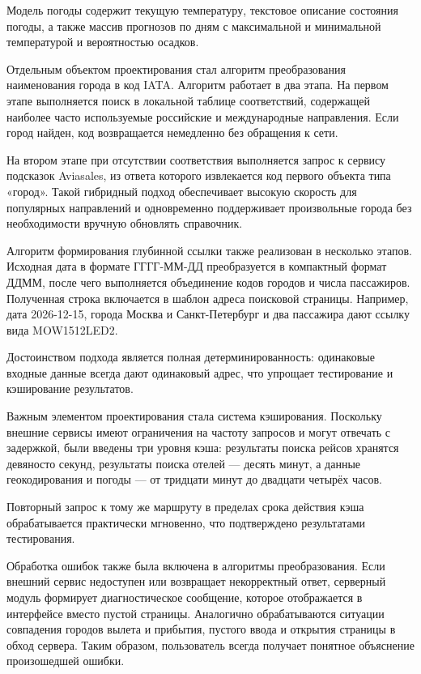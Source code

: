 \documentclass[14pt,a4paper,oneside]{extreport}
\begin{document}
Модель погоды содержит текущую температуру, текстовое описание состояния погоды, а также массив прогнозов по дням с максимальной и минимальной температурой и вероятностью осадков.

Отдельным объектом проектирования стал алгоритм преобразования наименования города в код IATA. Алгоритм работает в два этапа. На первом этапе выполняется поиск в локальной таблице соответствий, содержащей наиболее часто используемые российские и международные направления. Если город найден, код возвращается немедленно без обращения к сети.

На втором этапе при отсутствии соответствия выполняется запрос к сервису подсказок Aviasales, из ответа которого извлекается код первого объекта типа «город». Такой гибридный подход обеспечивает высокую скорость для популярных направлений и одновременно поддерживает произвольные города без необходимости вручную обновлять справочник.

Алгоритм формирования глубинной ссылки также реализован в несколько этапов. Исходная дата в формате ГГГГ-ММ-ДД преобразуется в компактный формат ДДММ, после чего выполняется объединение кодов городов и числа пассажиров. Полученная строка включается в шаблон адреса поисковой страницы. Например, дата 2026-12-15, города Москва и Санкт-Петербург и два пассажира дают ссылку вида MOW1512LED2.

Достоинством подхода является полная детерминированность: одинаковые входные данные всегда дают одинаковый адрес, что упрощает тестирование и кэширование результатов.

Важным элементом проектирования стала система кэширования. Поскольку внешние сервисы имеют ограничения на частоту запросов и могут отвечать с задержкой, были введены три уровня кэша: результаты поиска рейсов хранятся девяносто секунд, результаты поиска отелей — десять минут, а данные геокодирования и погоды — от тридцати минут до двадцати четырёх часов.

Повторный запрос к тому же маршруту в пределах срока действия кэша обрабатывается практически мгновенно, что подтверждено результатами тестирования.

Обработка ошибок также была включена в алгоритмы преобразования. Если внешний сервис недоступен или возвращает некорректный ответ, серверный модуль формирует диагностическое сообщение, которое отображается в интерфейсе вместо пустой страницы. Аналогично обрабатываются ситуации совпадения городов вылета и прибытия, пустого ввода и открытия страницы в обход сервера. Таким образом, пользователь всегда получает понятное объяснение произошедшей ошибки.
\end{document}
